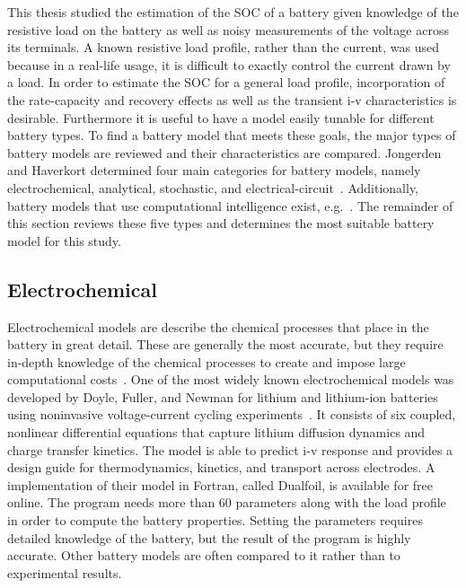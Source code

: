 \documentclass[../zhang_thesis.tex]{subfiles}
\begin{document}
This thesis studied the estimation of the SOC of a battery given knowledge of the resistive load on the battery as well as noisy measurements of the voltage across its terminals. A known resistive load profile, rather than the current, was used because in a real-life usage, it is difficult to exactly control the current drawn by a load. In order to estimate the SOC for a general load profile, incorporation of the rate-capacity and recovery effects as well as the transient i-v characteristics
is desirable. Furthermore it is useful to have a model easily tunable for different battery types. To find a battery model that meets these goals, the major types of battery models are reviewed and their characteristics are compared.
Jongerden and Haverkort determined four main categories for battery models, namely electrochemical, analytical, stochastic, and electrical-circuit~\cite{jongerden08}.
Additionally, battery models that use computational intelligence exist, e.g.~\cite{man12,ogorman98,capizzi11,wang06,shen02}.
The remainder of this section reviews these five types and determines the most suitable battery model for this study.

\subsection{Electrochemical}

Electrochemical models are describe the chemical processes that place in the battery in great detail. These are generally the most accurate, but they require in-depth knowledge of the chemical processes to create and impose large computational costs~\cite{jongerden09}. One of the most widely known electrochemical models was developed by Doyle, Fuller, and Newman for lithium and lithium-ion batteries using noninvasive voltage-current cycling
experiments~\cite{doyle93,fuller94,fuller94b}. It consists of six coupled, nonlinear differential equations that capture lithium diffusion dynamics and charge transfer kinetics. The model is able to predict i-v response and provides a design guide for thermodynamics, kinetics, and transport across electrodes. A implementation of their model in Fortran, called Dualfoil, is available for free online. The program needs more than 60 parameters along with the load profile
in order to compute the battery properties. Setting the parameters requires detailed knowledge of the battery, but the result of the program is highly accurate. Other battery models are often compared to it rather than to experimental results.
\end{document}
